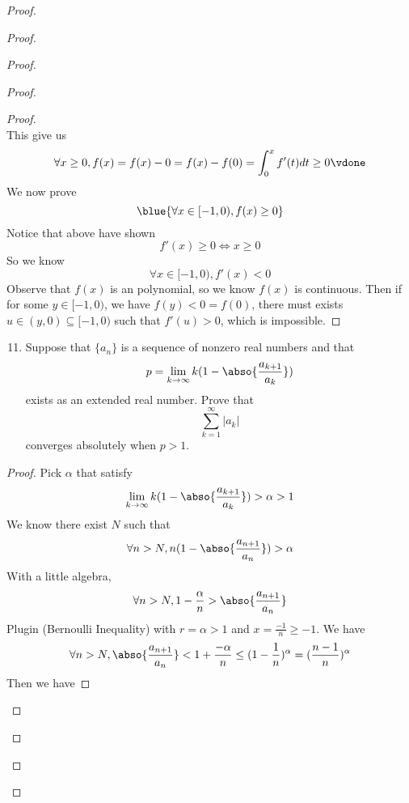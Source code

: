 \documentclass{report}
\begin{document}
\begin{proof}
\begin{proof}
\begin{proof}
\begin{proof}
\begin{proof}
\begin{equation*}
\end{equation*}
This give us 
\begin{equation*}
\forall x\geq 0, f(x)=f(x)-0=f(x)-f(0)=\int_{0}^x f'(t)dt\geq 0\vdone
\end{equation*}
We now prove
\begin{equation*}
\blue{\forall x\in [-1,0), f(x)\geq 0}
\end{equation*}
Notice that above have shown
\begin{equation*}
f'(x)\geq 0\iff  x\geq 0
\end{equation*}
So we know
\begin{equation*}
\forall x\in [-1,0), f'(x)<0
\end{equation*}
Observe that $f(x)$ is an polynomial, so we know  $f(x)$ is continuous. Then if for some $y\in [-1,0)$, we have $f(y)<0=f(0)$, there must exists $u\in (y,0)\subseteq [-1,0)$ such that $f'(u)>0$, which is impossible.
\end{proof}
\begin{question}{}{}
\begin{enumerate}
    \setcounter{enumi}{10}
    \item Suppose that \( \{ a_n \} \) is a sequence of nonzero real numbers and that
    \[
    p = \lim_{{k \to \infty}} k(1-\abso{\frac{a_{k+1}}{a_k}})
    \]
    exists as an extended real number. Prove that
    \[
    \sum_{k=1}^{\infty} |a_k|
    \]
    converges absolutely when \( p > 1 \).
\end{enumerate}
\end{question}
\begin{proof}
Pick $\alpha $ that satisfy
\begin{equation*}
\lim_{k\to\infty}k(1-\abso{\frac{a_{k+1}}{a_k}})>\alpha >1
\end{equation*}
We know there exist $N$ such that
 \begin{equation*}
\forall n>N, n(1-\abso{\frac{a_{n+1}}{a_n}})>\alpha 
\end{equation*}
With a little algebra,
\begin{equation*}
\forall n>N, 1-\frac{\alpha }{n}>\abso{\frac{a_{n+1}}{a_n}}
\end{equation*}
Plugin  (Bernoulli Inequality) with $r=\alpha >1$ and $x=\frac{-1}{n}\geq -1$. We have
\begin{equation*}
\forall n>N,\abso{\frac{a_{n+1}}{a_n}}<1+\frac{-\alpha }{n}\leq (1-\frac{1}{n})^\alpha= (\frac{n-1}{n})^{\alpha }
\end{equation*}
Then we have

\end{proof}
\end{proof}
\end{proof}
\end{proof}
\end{proof}
\end{document}
